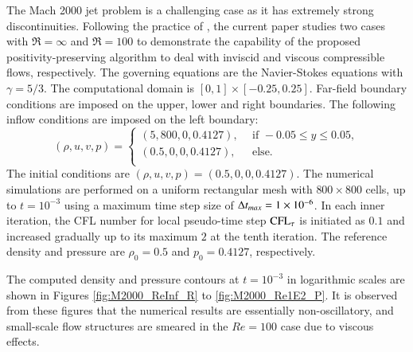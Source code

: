 The Mach 2000 jet problem \cite{zhang2010positivity} is a challenging case as it has extremely strong discontinuities.
Following the practice of \cite{huang2024general},
the current paper studies two cases with $\Re=\infty$ and $\Re=100$ to demonstrate the capability of the proposed positivity-preserving algorithm to deal with inviscid and viscous compressible flows, respectively.
{The governing equations are the Navier-Stokes equations with $\gamma=5/3$.}
The computational domain is $[0,1]\times[-0.25,0.25]$.
Far-field boundary conditions are imposed on the upper, lower and right boundaries. The following inflow conditions are imposed on the left boundary:
\begin{equation}
    (\rho,u,v,p) = \left\{
    \begin{array}{ll}
        (5,800,0,0.4127),\ \  & \text{if } -0.05 \leq y \leq 0.05, \\
        (0.5,0,0,0.4127),\ \  & \text{else}.                       \\
    \end{array}
    \right.
\end{equation}
The initial conditions are $(\rho,u,v,p)=(0.5,0,0,0.4127)$.
The numerical simulations are performed on a uniform rectangular mesh with $800 \times 800$ cells, up to $t=10^{-3}$ using a maximum time step size of $\mathrm\Delta t_{max} = 1\times10^{-6}$.
In each inner iteration, the CFL number for local pseudo-time step $\text{CFL}_\tau$ is initiated as $0.1$
and increased gradually up to its maximum $2$ at the tenth iteration.
The reference density and pressure are
$\rho_0=0.5$ and $p_0=0.4127$, respectively.

The computed density and pressure contours at $t=10^{-3}$ in logarithmic scales are shown in Figures \ref{fig:M2000_ReInf_R} to \ref{fig:M2000_Re1E2_P}.
It is observed from these figures that the numerical results are essentially non-oscillatory, and small-scale flow structures are smeared in the $Re=100$ case due to viscous effects.

